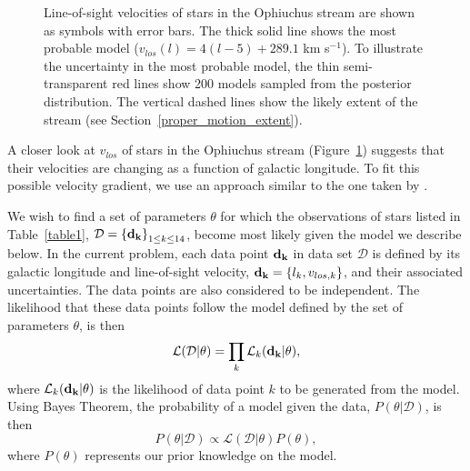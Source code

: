 \documentclass[iop]{emulateapj}
\begin{document}
\begin{figure}
\caption{
Line-of-sight velocities of stars in the Ophiuchus stream are shown as symbols
with error bars. The thick solid line shows the most probable model
($v_{los}(l)=4(l-5)+289.1$ km s$^{-1}$). To illustrate the uncertainty in the
most probable model, the thin semi-transparent red lines show 200 models sampled
from the posterior distribution. The vertical dashed lines show the likely
extent of the stream (see Section~\ref{proper_motion_extent}).
\label{gl_vs_rv}}
\end{figure}

A closer look at $v_{los}$ of stars in the Ophiuchus stream
(Figure~\ref{gl_vs_rv}) suggests that their velocities are changing as a
function of galactic longitude. To fit this possible velocity gradient, we use
an approach similar to the one taken by \citet[see their Section 2.1.1]{mj10}.

We wish to find a set of parameters $\theta$ for which the observations of
stars listed in Table~\ref{table1}, $\mathcal{D}={\bf \{d_k\}}_{1\leq k\leq14}$,
become most likely given the model we describe below. In the current problem,
each data point ${\bf d_k}$ in data set $\mathcal{D}$ is defined by its galactic
longitude and line-of-sight velocity, ${\bf d_k}=\{l_k, v_{los,k}\}$, and their
associated uncertainties. The data points are also considered to be independent.
The likelihood that these data points follow the model defined by the set of
parameters $\theta$, is then
\begin{equation}
    \mathcal{L}(\mathcal{D} | \theta) = \prod_k \mathcal{L}_k({\bf d_k | \theta})\label{total_likelihood},
\end{equation}
where $\mathcal{L}_k({\bf d_k | \theta})$ is the likelihood of data point $k$ to
be generated from the model. Using Bayes Theorem, the probability of a model
given the data, $P(\theta | \mathcal{D})$, is then
\begin{equation}
    P(\theta | \mathcal{D}) \propto \mathcal{L}(\mathcal{D} | \theta)P(\theta)\label{probability_of_a_model},
\end{equation}
where $P(\theta)$ represents our prior knowledge on the model.
\end{document}
